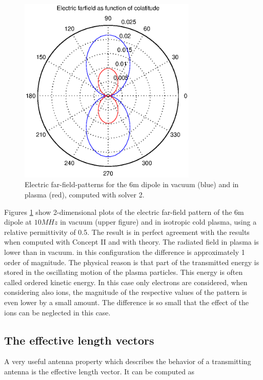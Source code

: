 \documentclass[two-column,ras]{agutex}
\begin{document}
\begin{article}
\begin{figure}
  \noindent\includegraphics[width=20pc]{ff_10mhz.eps}
\caption{Electric far-field-patterns for the 6m dipole in vacuum (blue) and in plasma (red), computed with solver 2.}
\label{fig:patterns_vacuum}
\end{figure}

Figures \ref{fig:patterns_vacuum} show 2-dimensional plots of the electric far-field pattern of the 6m dipole at $10 MHz$ in vacuum (upper figure) and in isotropic cold plasma, using a relative permittivity of 0.5. The result is in perfect agreement with the results when computed with Concept II and with theory. The radiated field in plasma is lower than in vacuum. in this configuration the difference is approximately 1 order of magnitude. The physical reason is that part of the transmitted energy is stored in the oscillating motion of the plasma particles. This energy is often called ordered kinetic energy. In this case only electrons are considered, when considering also ions, the magnitude of the respective values of the pattern is even lower by a small amount. The difference is so small that the effect of the ions can be neglected in this case.

\subsection{The effective length vectors}
A very useful antenna property which describes the behavior of a transmitting antenna is the effective length vector. It can be computed as


\end{article}
\end{document}
